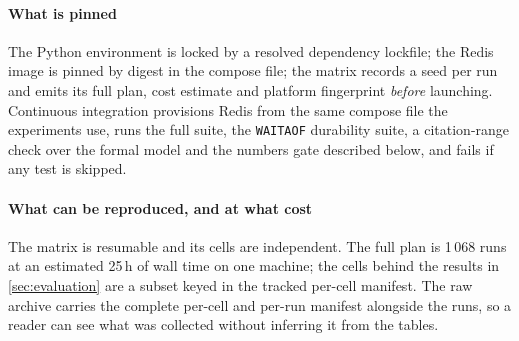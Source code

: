 
\paragraph{What is pinned} The Python environment is locked
by a resolved dependency lockfile; the Redis image is pinned by digest in the
compose file;
the matrix records a seed per run and emits its full plan, cost estimate and
platform fingerprint \emph{before} launching. Continuous integration
provisions Redis from the same compose file the experiments use, runs the full
suite, the \texttt{WAITAOF} durability suite, a citation-range check over
the formal model and the numbers gate described below, and fails if any test is
skipped.

\paragraph{What can be reproduced, and at what cost} The matrix is resumable
and its cells are independent. The full plan is 1\,068 runs at an estimated
25\,h of wall time on one machine; the cells behind the results in
\cref{sec:evaluation} are a subset keyed in the tracked per-cell manifest. The raw archive carries the complete per-cell and
per-run manifest alongside the runs, so a reader can see what was collected
without inferring it from the tables.

